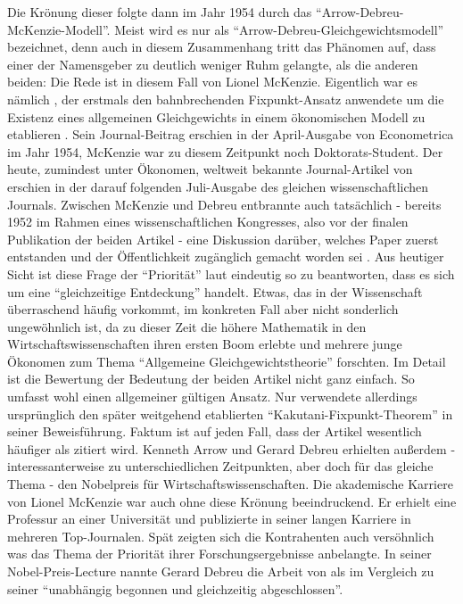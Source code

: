 Die Krönung dieser folgte dann im Jahr 1954 durch das "`Arrow-Debreu-McKenzie-Modell"'. Meist wird es nur als "`Arrow-Debreu-Gleichgewichtsmodell"' bezeichnet, denn auch in diesem Zusammenhang tritt das Phänomen auf, dass einer der Namensgeber zu deutlich weniger Ruhm gelangte, als die anderen beiden: Die Rede ist in diesem Fall von Lionel McKenzie. Eigentlich war es nämlich \textcite{McKenzie1954}, der erstmals den bahnbrechenden Fixpunkt-Ansatz anwendete um die Existenz eines allgemeinen Gleichgewichts in einem ökonomischen Modell zu etablieren \parencite[S. 199]{Weintraub2011}. Sein Journal-Beitrag erschien in der April-Ausgabe von Econometrica im Jahr 1954, McKenzie war zu diesem Zeitpunkt noch Doktorats-Student. Der heute, zumindest unter Ökonomen, weltweit bekannte Journal-Artikel von \textcite{Arrow1954} erschien in der darauf folgenden Juli-Ausgabe des gleichen wissenschaftlichen Journals. Zwischen McKenzie und Debreu entbrannte auch tatsächlich - bereits 1952 im Rahmen eines wissenschaftlichen Kongresses, also vor der finalen Publikation der beiden Artikel - eine Diskussion darüber, welches Paper zuerst entstanden und der Öffentlichkeit zugänglich gemacht worden sei \parencite[S. 206]{Weintraub2011}. Aus heutiger Sicht ist diese Frage der "`Priorität"' laut \textcite[S. 210]{Weintraub2011} eindeutig so zu beantworten, dass es sich um eine "`gleichzeitige Entdeckung"' handelt. Etwas, das in der Wissenschaft überraschend häufig vorkommt, im konkreten Fall aber nicht sonderlich ungewöhnlich ist, da zu dieser Zeit die höhere Mathematik in den Wirtschaftswissenschaften ihren ersten Boom erlebte und mehrere junge Ökonomen zum Thema "`Allgemeine Gleichgewichtstheorie"' forschten. Im Detail ist die Bewertung der Bedeutung der beiden Artikel nicht ganz einfach. So umfasst \textcite{Arrow1954} wohl einen allgemeiner gültigen Ansatz. Nur \textcite{McKenzie1954} verwendete allerdings ursprünglich den später weitgehend etablierten "`Kakutani-Fixpunkt-Theorem"' \parencite{Kakutani1941} in seiner Beweisführung. Faktum ist auf jeden Fall, dass der Artikel \textcite{Arrow1954} wesentlich häufiger als \textcite{McKenzie1954} zitiert wird. Kenneth Arrow und Gerard Debreu erhielten außerdem - interessanterweise zu unterschiedlichen Zeitpunkten, aber doch für das gleiche Thema - den Nobelpreis für Wirtschaftswissenschaften. Die akademische Karriere von Lionel McKenzie war auch ohne diese Krönung beeindruckend. Er erhielt eine Professur an einer Universität und publizierte in seiner langen Karriere in mehreren Top-Journalen. Spät zeigten sich die Kontrahenten auch versöhnlich was das Thema der Priorität ihrer Forschungsergebnisse anbelangte. In seiner Nobel-Preis-Lecture \parencite{Debreu1983b} nannte Gerard Debreu die Arbeit von \textcite{McKenzie1954} als im Vergleich zu seiner "`unabhängig begonnen und gleichzeitig abgeschlossen"'.

